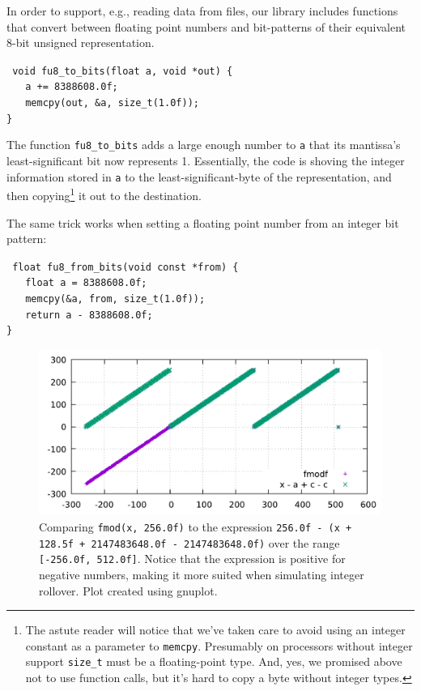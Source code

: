 \documentclass{acmsiggraph}
\theoremstyle{remark}
\theoremstyle{definition}
\begin{document}
In order to support, e.g., reading data from files, our library includes functions that convert between floating point numbers and bit-patterns of their equivalent 8-bit unsigned representation.

{\tt
void fu8\_to\_bits(float a, void *out) \{ \\
$\phantom{XX}$a += 8388608.0f; \\
$\phantom{XX}$memcpy(out, \&a, size\_t(1.0f)); \\
\}
}

The function {\tt fu8\_to\_bits} adds a large enough number to {\tt a} that its mantissa's least-significant bit now represents 1.
Essentially, the code is shoving the integer information stored in {\tt a} to the least-significant-byte of the representation, and then copying\footnote{
The astute reader will notice that we've taken care to avoid using an integer constant as a parameter to {\tt memcpy}.
Presumably on processors without integer support {\tt size\_t} must be a floating-point type.
And, yes, we promised above not to use function calls, but it's hard to copy a byte without integer types.
} it out to the destination.

The same trick works when setting a floating point number from an integer bit pattern:

{\tt
float fu8\_from\_bits(void const *from) \{ \\
$\phantom{XX}$float a = 8388608.0f; \\
$\phantom{XX}$memcpy(\&a, from, size\_t(1.0f)); \\
$\phantom{XX}$return a - 8388608.0f; \\
\}
}


\begin{figure}[tb!]
\includegraphics[width=\columnwidth]{fmodf.pdf}
\caption{\label{fig-mod-graph} Comparing {\tt fmod(x, 256.0f)} to the expression {\tt 256.0f - (x + 128.5f + 2147483648.0f - 2147483648.0f)} over the range {\tt [-256.0f, 512.0f]}.
Notice that the expression is positive for negative numbers, making it more suited when simulating integer rollover.
{\small Plot created using gnuplot.}}
\end{figure}
\end{document}
